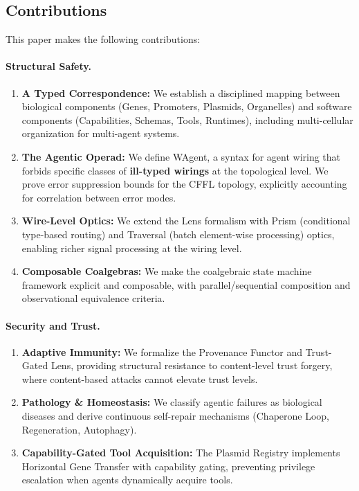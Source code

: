 \subsection{Contributions}

This paper makes the following contributions:

\paragraph{Structural Safety.}
\begin{enumerate}[leftmargin=*]
\item \textbf{A Typed Correspondence:} We establish a disciplined mapping between biological components
(Genes, Promoters, Plasmids, Organelles) and software components (Capabilities, Schemas, Tools, Runtimes),
including multi-cellular organization for multi-agent systems.
\item \textbf{The Agentic Operad:} We define WAgent, a syntax for agent wiring that forbids specific classes
of \textbf{ill-typed wirings} at the topological level. We prove error suppression bounds for the CFFL
topology, explicitly accounting for correlation between error modes.
\item \textbf{Wire-Level Optics:} We extend the Lens formalism with Prism (conditional type-based routing)
and Traversal (batch element-wise processing) optics, enabling richer signal processing at the wiring level.
\item \textbf{Composable Coalgebras:} We make the coalgebraic state machine framework explicit and
composable, with parallel/sequential composition and observational equivalence criteria.
\end{enumerate}

\paragraph{Security and Trust.}
\begin{enumerate}[leftmargin=*,resume]
\item \textbf{Adaptive Immunity:} We formalize the Provenance Functor and Trust-Gated Lens, providing
structural resistance to content-level trust forgery, where content-based attacks cannot elevate trust levels.
\item \textbf{Pathology \& Homeostasis:} We classify agentic failures as biological diseases and derive
continuous self-repair mechanisms (Chaperone Loop, Regeneration, Autophagy).
\item \textbf{Capability-Gated Tool Acquisition:} The Plasmid Registry implements Horizontal Gene
Transfer with capability gating, preventing privilege escalation when agents dynamically acquire tools.
\end{enumerate}

